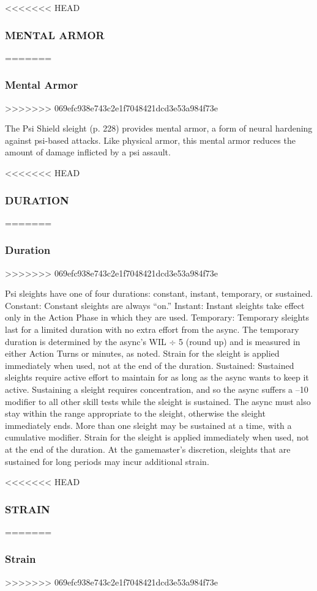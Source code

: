 <<<<<<< HEAD \subsubsection{MENTAL ARMOR} ======= \subsubsection{Mental Armor} >>>>>>> 069efc938e743c2e1f7048421dcd3e53a984f73e 

The Psi Shield sleight (p. 228) provides mental armor, a form of neural hardening against psi-based attacks. Like physical armor, this mental armor reduces the amount of damage inflicted by a psi assault. 

<<<<<<< HEAD \subsubsection{DURATION} ======= \subsubsection{Duration} >>>>>>> 069efc938e743c2e1f7048421dcd3e53a984f73e 

Psi sleights have one of four durations: constant, instant, temporary, or sustained. Constant: Constant sleights are always “on.” Instant: Instant sleights take effect only in the Action Phase in which they are used. Temporary: Temporary sleights last for a limited duration with no extra effort from the async. The temporary duration is determined by the async’s WIL $\div$ 5 (round up) and is measured in either Action Turns or minutes, as noted. Strain for the sleight is applied immediately when used, not at the end of the duration. Sustained: Sustained sleights require active effort to maintain for as long as the async wants to keep it active. Sustaining a sleight requires concentration, and so the async suffers a –10 modifier to all other skill tests while the sleight is sustained. The async must also stay within the range appropriate to the sleight, otherwise the sleight immediately ends. More than one sleight may be sustained at a time, with a cumulative modifier. Strain for the sleight is applied immediately when used, not at the end of the duration. At the gamemaster’s discretion, sleights that are sustained for long periods may incur additional strain. 

<<<<<<< HEAD \subsubsection{STRAIN} ======= \subsubsection{Strain} >>>>>>> 069efc938e743c2e1f7048421dcd3e53a984f73e 

